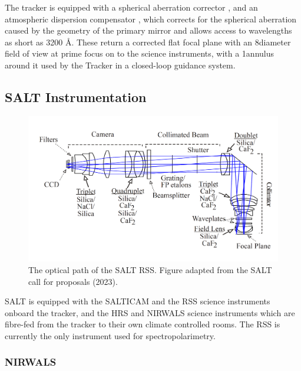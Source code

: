
The tracker is equipped with a spherical aberration corrector \citep{SALT_SAC}, and an atmospheric dispersion compensator \citep{SALT_ADC}, which corrects for the spherical aberration caused by the geometry of the primary mirror and allows access to wavelengths as short as 3200 \AA. These return a corrected flat focal plane with an 8\arcmin diameter field of view at prime focus on to the science instruments, with a 1\arcmin annulus around it used by the Tracker in a closed-loop guidance system.


\subsection{SALT Instrumentation} \label{subsec:SALT_instr}

\begin{figure}[t]
    \centering
    \includegraphics[width = 1.0\textwidth]{figures/2_RSS_optical_path.png}
    \caption{The optical path of the \gls{SALT} \gls{RSS}. Figure adapted from the SALT call for proposals (2023).\protect\footnotemark}
    \label{fig:RSS_layout}
\end{figure}

SALT is equipped with the \gls{SALTICAM} and the \gls{RSS} science instruments onboard the tracker, and the \gls{HRS} and \gls{NIRWALS} science instruments which are fibre-fed from the tracker to their own climate controlled rooms. The \gls{RSS} is currently the only instrument used for spectropolarimetry.

\subsubsection{\gls{NIRWALS}}

